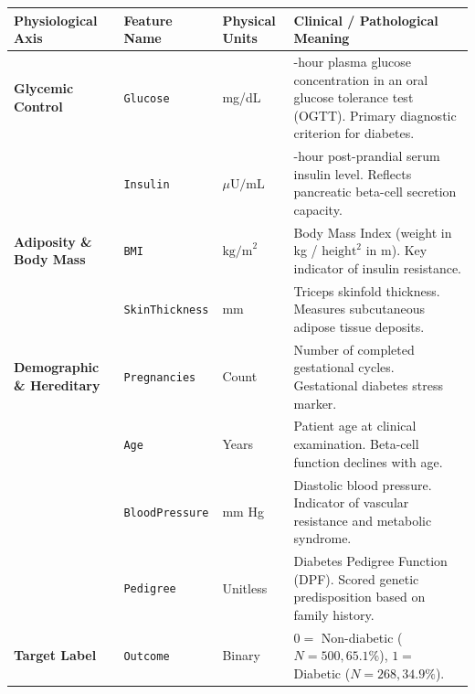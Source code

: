 \begin{longtable}[]{@{}
  >{\raggedright\arraybackslash}p{}
  >{\raggedright\arraybackslash}p{}
  >{\centering\arraybackslash}p{}
  >{\raggedright\arraybackslash}p{}@{}}
\toprule\noalign{}
\begin{minipage}[b]{\linewidth}\raggedright
Physiological Axis
\end{minipage} & \begin{minipage}[b]{\linewidth}\raggedright
Feature Name
\end{minipage} & \begin{minipage}[b]{\linewidth}\centering
Physical Units
\end{minipage} & \begin{minipage}[b]{\linewidth}\raggedright
Clinical / Pathological Meaning
\end{minipage} \\
\midrule\noalign{}
\endhead
\bottomrule\noalign{}
\endlastfoot
\textbf{Glycemic Control} & \texttt{Glucose} & mg/dL & 2-hour plasma
glucose concentration in an oral glucose tolerance test (OGTT). Primary
diagnostic criterion for diabetes. \\
& \texttt{Insulin} & \(\mu\text{U/mL}\) & 2-hour post-prandial serum
insulin level. Reflects pancreatic beta-cell secretion capacity. \\
\textbf{Adiposity \& Body Mass} & \texttt{BMI} & \(\text{kg/m}^2\) &
Body Mass Index (weight in kg / \(\text{height}^2\) in m). Key indicator
of insulin resistance. \\
& \texttt{SkinThickness} & mm & Triceps skinfold thickness. Measures
subcutaneous adipose tissue deposits. \\
\textbf{Demographic \& Hereditary} & \texttt{Pregnancies} & Count &
Number of completed gestational cycles. Gestational diabetes stress
marker. \\
& \texttt{Age} & Years & Patient age at clinical examination. Beta-cell
function declines with age. \\
& \texttt{BloodPressure} & mm Hg & Diastolic blood pressure. Indicator
of vascular resistance and metabolic syndrome. \\
& \texttt{Pedigree} & Unitless & Diabetes Pedigree Function (DPF).
Scored genetic predisposition based on family history. \\
\textbf{Target Label} & \texttt{Outcome} & Binary & \(0 =\) Non-diabetic
(\(N=500, 65.1\%\)), \(1 =\) Diabetic (\(N=268, 34.9\%\)). \\
\end{longtable}

